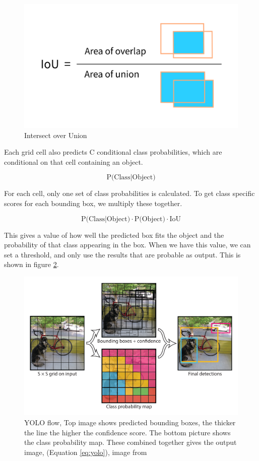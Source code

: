 \begin{figure}[h!]
\centering
\includegraphics[width=0.8 \textwidth]{fig/iou2.png}
\caption{Intersect over Union}
\label{fig:IoU}
\end{figure}

Each grid cell also predicts C conditional class probabilities, which are conditional on that cell containing an object. 

\begin{equation}
  \text{P(Class}|\text{Object)}
\end{equation}


For each cell, only one set of class probabilities is calculated. To get class specific scores for each bounding box, we multiply these together. 

\begin{equation}
    \text{P(Class}|\text{Object)} \cdot \text{P(Object)} \cdot \text{IoU}
    \label{eq:yolo}
\end{equation}

This gives a value of how well the predicted box fits the object and the probability of that class appearing in the box. When we have this value, we can set a threshold, and only use the results that are probable as output. This is shown in figure \ref{fig:yolo_flow}.  

\begin{figure}[h!]
\centering
\includegraphics[width=0.8 \textwidth]{images/yolo_flow.png}
\caption{YOLO flow, Top image shows predicted bounding boxes, the thicker the line the higher the confidence score. The bottom picture shows the class probability map. These combined together gives the output image, (Equation \ref{eq:yolo}), image from \citep{YOLOv1}}
\label{fig:yolo_flow}
\end{figure}

